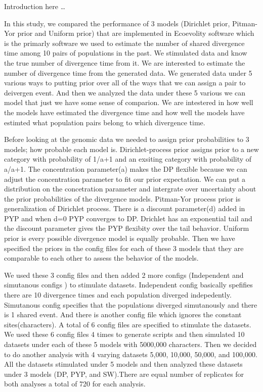 Introduction here \ldots

In this study, we compared the performance of 3 models (Dirichlet prior, Pitman-Yor prior and Uniform prior) 
that are implemented in Ecoevolity software which is the primarly software we used to estimate the number of shared divergence time among 10 pairs of
 populations in the past. We stimulated data and know the true number of divergence time from it. We are interested to estimate the number of 
divergence time from the generated data. We generated data under 5 various ways to putting prior over all of the ways that we can assign a pair to deivergen event. And then we analyzed the data under these 5 various we can model that just we have some sense of comparion. We are intestered in how well 
the models have estimated the divergence time and how well the models have estimted what population pairs belong to which divergence time. 

Before looking at the genomic data we needed to assign prior probabilities to 3 models; how probable each model is. Dirichlet-process prior assigns prior 
to a new category with probability of 1/a+1 and an exsiting category with probability of a/a+1. The concentration parameter(a) makes the DP flexible
because we can adjust the concentration parameter to fit our prior expectation. We can put a distribution on the concetration parameter and intergrate 
over uncertainty about the prior probabilities of the divergence models. Pitman-Yor process prior is generalization of Dirichlet process. 
There is a discount parameter(d) added in PYP and when d=0 PYP converges to DP. Drichlet has an exponential tail and the discount parameter gives the PYP flexibity
over the tail behavior. Uniform prior is every possible divergence model is equally probable. Then we have specified the priors in the config files
for each of these 3 models that they are comparable to each other to assess the behavior of the models. 

We used these 3 config files and then added 2 more configs (Independent and simutanous configs ) to stimulate datasets. Independent config basically spefifies 
there are 10 divergence times and each population diverged indepedently. Simutanous config specifies that the populations diverged simutanously and 
there is 1 shared event. And there is another config file which ignores the constant sites(characters). A total of 6 config files are specified to 
stimulate the datasets. We used these 6 config files 4 times to generate scripts and then simulated 10 datasets under each of these 5 models with 5000,000
characters. Then we decided to do another analysis with 4 varying datasets 5,000, 10,000, 50,000, and 100,000. All the datasets stimulated under 5 models 
and then analyzed these datasets under 3 models (DP, PYP, and SW).There are equal number of replicates for both analyses a total of 720 for each analysis. 
 


 
 
      

